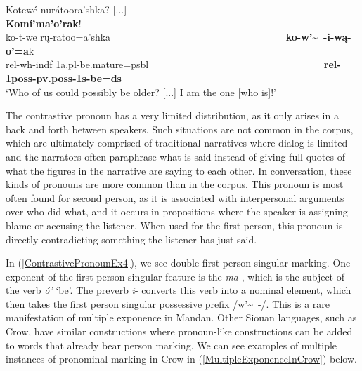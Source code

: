 \begin{exe}
\begin{xlist}
\item\label{ContrastivePronounEx4} \glll Kotewé nurátoora'shka? [...] ~ ~ ~ ~ ~ ~ ~ ~ ~ ~  ~ ~ ~ ~ ~ ~ ~ ~ ~ ~ \textbf{Komí'ma'o'rak}!\\
    ko-t-we rų-ratoo=a'shka ~ ~ ~ ~ ~ ~ ~ ~ ~ ~ ~ ~ ~ ~ ~ ~ ~ ~ ~ ~ ~ \textbf{ko-w'\~~-i-wą-o'=a}k\\
    rel-wh-indf 1a.pl-\textnormal{be.mature}=psbl ~ ~ ~ ~ ~ ~ ~ ~ ~ ~ ~ ~ ~ ~ ~ ~ ~ ~ ~ ~ ~ \textbf{rel-1poss-pv.poss-1s-\textnormal{\bfseries be}=ds}\\
    \glt `Who of us could possibly be older? [...] I am the one [who is]!' \citep[6]{hollow1973a}

\end{xlist}

\end{exe}

The contrastive pronoun has a very limited distribution, as it only arises in a back and forth between speakers. Such situations are not common in the corpus, which are ultimately comprised of traditional narratives where dialog is limited and the narrators often paraphrase what is said instead of giving full quotes of what the figures in the narrative are saying to each other. In conversation, these kinds of pronouns are more common than in the corpus. This pronoun is most often found for second person, as it is associated with interpersonal arguments over who did what, and it occurs in propositions where the speaker is assigning blame or accusing the listener. When used for the first person, this pronoun is directly contradicting something the listener has just said.

In (\ref{ContrastivePronounEx4}), we see double first person singular marking. One exponent of the first person singular feature is the \textit{ma}-, which is the subject of the verb \textit{ó'} `be'. The preverb \textit{i}- converts this verb into a nominal element, which then takes the first person singular possessive prefix /w'\~~-/. This is a rare manifestation of multiple exponence in Mandan. Other Siouan languages, such as Crow, have similar constructions where pronoun-like constructions can be added to words that already bear person marking. We can see examples of multiple instances of pronominal marking in Crow in (\ref{MultipleExponenceInCrow}) below.

\newpage


